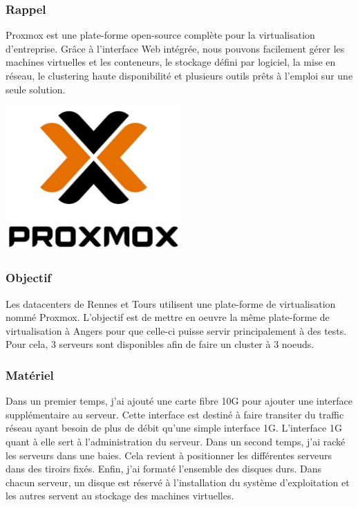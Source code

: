 \documentclass[12pt]{article}
\begin{document}
\subsubsection{Rappel}
\noindent%
\begin{minipage}{.7\textwidth}%
Proxmox est une plate-forme open-source complète pour la virtualisation d'entreprise. Grâce à l'interface Web intégrée, nous pouvons facilement gérer les machines virtuelles et les conteneurs, le stockage défini par logiciel, la mise en réseau, le clustering haute disponibilité et plusieurs outils prêts à l'emploi sur une seule solution.

\end{minipage}%
\hfill
\begin{minipage}{.3\textwidth}%
\begin{center}
\includegraphics[width=0.5\textwidth]{src/proxmox.JPG}
\end{center}
\end{minipage}%


\subsubsection{Objectif}
Les datacenters de Rennes et Tours utilisent une plate-forme de virtualisation nommé Proxmox. L'objectif est de mettre en oeuvre la même plate-forme de virtualisation à Angers pour que celle-ci puisse servir principalement à des tests. Pour cela, 3 serveurs sont disponibles afin de faire un cluster à 3 noeuds.

\subsubsection{Matériel}
Dans un premier temps, j'ai ajouté une carte fibre 10G pour ajouter une interface supplémentaire au serveur. Cette interface est destiné à faire transiter du traffic réseau ayant besoin de plus de débit qu'une simple interface 1G. L'interface 1G quant à elle sert à l'administration du serveur.
Dans un second temps, j'ai racké les serveurs dans une baies. Cela revient à positionner les différentes serveurs dans des tiroirs fixés.
Enfin, j'ai formaté l'ensemble des disques durs. Dans chacun serveur, un disque est réservé à l'installation du système d'exploitation et les autres servent au stockage des machines virtuelles.
\end{document}
